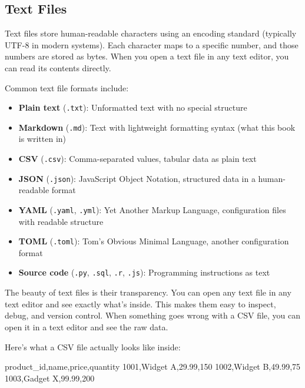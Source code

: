 \documentclass[
  letterpaper,
  DIV=11,
  numbers=noendperiod]{scrreprt}
\newenvironment{Shaded}{\begin{snugshade}}{\end{snugshade}}
\newcommand{\NormalTok}[1]{\textcolor[rgb]{0.00,0.23,0.31}{#1}}
\providecommand{\tightlist}{%
  \setlength{\itemsep}{0pt}\setlength{\parskip}{0pt}}
\begin{document}
\subsection{Text Files}\label{text-files}

Text files store human-readable characters using an encoding standard
(typically UTF-8 in modern systems). Each character maps to a specific
number, and those numbers are stored as bytes. When you open a text file
in any text editor, you can read its contents directly.

Common text file formats include:

\begin{itemize}
\tightlist
\item
  \textbf{Plain text} (\texttt{.txt}): Unformatted text with no special
  structure
\item
  \textbf{Markdown} (\texttt{.md}): Text with lightweight formatting
  syntax (what this book is written in)
\item
  \textbf{CSV} (\texttt{.csv}): Comma-separated values, tabular data as
  plain text
\item
  \textbf{JSON} (\texttt{.json}): JavaScript Object Notation, structured
  data in a human-readable format
\item
  \textbf{YAML} (\texttt{.yaml}, \texttt{.yml}): Yet Another Markup
  Language, configuration files with readable structure
\item
  \textbf{TOML} (\texttt{.toml}): Tom's Obvious Minimal Language,
  another configuration format
\item
  \textbf{Source code} (\texttt{.py}, \texttt{.sql}, \texttt{.r},
  \texttt{.js}): Programming instructions as text
\end{itemize}

The beauty of text files is their transparency. You can open any text
file in any text editor and see exactly what's inside. This makes them
easy to inspect, debug, and version control. When something goes wrong
with a CSV file, you can open it in a text editor and see the raw data.

Here's what a CSV file actually looks like inside:

\begin{codelisting}

\caption{\texttt{products.csv}}

\begin{Shaded}
\begin{Highlighting}[]
\NormalTok{product\_id,name,price,quantity}
\NormalTok{1001,Widget A,29.99,150}
\NormalTok{1002,Widget B,49.99,75}
\NormalTok{1003,Gadget X,99.99,200}
\end{Highlighting}
\end{Shaded}

\end{codelisting}
\end{document}
